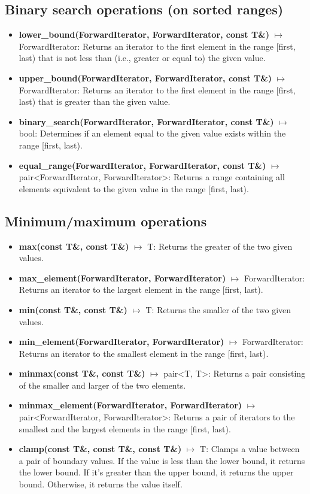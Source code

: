 \documentclass{report}
\begin{document}
    \bigbreak \noindent 
    \subsection{Binary search operations (on sorted ranges)}
    \begin{itemize}
          \item \textbf{lower\_bound(ForwardIterator, ForwardIterator, const T\&)} \(\mapsto\) ForwardIterator: Returns an iterator to the first element in the range [first, last) that is not less than (i.e., greater or equal to) the given value.
        \item \textbf{upper\_bound(ForwardIterator, ForwardIterator, const T\&)} \(\mapsto\) ForwardIterator: Returns an iterator to the first element in the range [first, last) that is greater than the given value.
        \item \textbf{binary\_search(ForwardIterator, ForwardIterator, const T\&)} \(\mapsto\) bool: Determines if an element equal to the given value exists within the range [first, last).
        \item \textbf{equal\_range(ForwardIterator, ForwardIterator, const T\&)} \(\mapsto\) pair<ForwardIterator, ForwardIterator>: Returns a range containing all elements equivalent to the given value in the range [first, last).
    \end{itemize}


    \bigbreak \noindent 
    \subsection{Minimum/maximum operations}
    \begin{itemize}
         \item \textbf{max(const T\&, const T\&)} \(\mapsto\) T: Returns the greater of the two given values.
        \item \textbf{max\_element(ForwardIterator, ForwardIterator)} \(\mapsto\) ForwardIterator: Returns an iterator to the largest element in the range [first, last).
        \item \textbf{min(const T\&, const T\&)} \(\mapsto\) T: Returns the smaller of the two given values.
        \item \textbf{min\_element(ForwardIterator, ForwardIterator)} \(\mapsto\) ForwardIterator: Returns an iterator to the smallest element in the range [first, last).
        \item \textbf{minmax(const T\&, const T\&)} \(\mapsto\) pair<T, T>: Returns a pair consisting of the smaller and larger of the two elements.
        \item \textbf{minmax\_element(ForwardIterator, ForwardIterator)} \(\mapsto\) pair<ForwardIterator, ForwardIterator>: Returns a pair of iterators to the smallest and the largest elements in the range [first, last).
        \item \textbf{clamp(const T\&, const T\&, const T\&)} \(\mapsto\) T: Clamps a value between a pair of boundary values.  If the value is less than the lower bound, it returns the lower bound. If it's greater than the upper bound, it returns the upper bound. Otherwise, it returns the value itself.
    \end{itemize}
\end{document}
